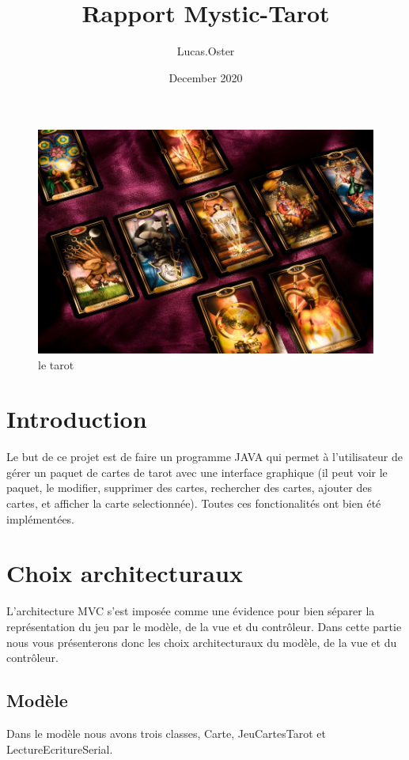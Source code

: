 \documentclass{article}
\title{Rapport Mystic-Tarot}
\author{Lucas.Oster }
\date{December 2020}
\begin{document}
\maketitle

\begin{figure}[!h]
\centering
\includegraphics[scale=1]{tarot}
\caption{le tarot}
\label{fig:le tarot}
\end{figure}

\newpage

\tableofcontents
\newpage
\section{Introduction}
Le but de ce projet est de faire un programme JAVA qui permet à l'utilisateur de gérer un paquet de cartes de tarot avec une interface graphique (il peut voir le paquet, le modifier, supprimer des cartes, rechercher des cartes, ajouter des cartes, et afficher la carte selectionnée).
Toutes ces fonctionalités ont bien été implémentées.




\section{Choix architecturaux}
L'architecture MVC s'est imposée comme une évidence pour bien séparer la représentation du jeu par le modèle, de la vue et du contrôleur.
Dans cette partie nous vous présenterons donc les choix architecturaux du modèle, de la vue et du contrôleur.
\subsection{Modèle}
Dans le modèle nous avons trois classes, Carte, JeuCartesTarot et LectureEcritureSerial.
\end{document}
